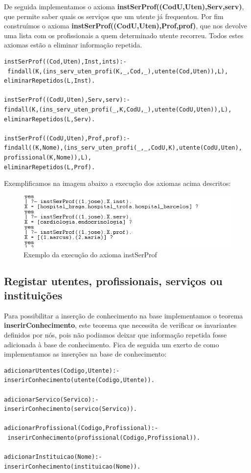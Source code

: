 De seguida implementamos o axioma \textbf{instSerProf((CodU,Uten),Serv,serv)}, que permite saber quais os serviços que um utente já frequentou. 
Por fim construímos o axioma \textbf{instSerProf((CodU,Uten),Prof,prof)}, que nos devolve uma lista com os profissionais a quem determinado utente recorreu. Todos estes axiomas estão a eliminar informação repetida. 

\begin{verbatim}
instSerProf((Cod,Uten),Inst,ints):-
 findall(K,(ins_serv_uten_profi(K,_,Cod,_),utente(Cod,Uten)),L),
eliminarRepetidos(L,Inst).

instSerProf((CodU,Uten),Serv,serv):-
findall(K,(ins_serv_uten_profi(_,K,CodU,_),utente(CodU,Uten)),L),
eliminarRepetidos(L,Serv).

instSerProf((CodU,Uten),Prof,prof):-
findall((K,Nome),(ins_serv_uten_profi(_,_,CodU,K),utente(CodU,Uten),
profissional(K,Nome)),L),
eliminarRepetidos(L,Prof).
\end{verbatim}

Exemplificamos na imagem abaixo a execução dos axiomas acima descritos: 

\begin{figure}[<+htpb+>]
	\centering
	\includegraphics[scale=0.9]{answer8.png}
	\caption{Exemplo da execução do axioma instSerProf}
	\label{p3:fig:output8}
\end{figure}


\subsection{Registar utentes, profissionais, serviços ou instituições}
Para possibilitar a inserção de conhecimento na base implementamos o teorema \textbf{inserirConhecimento}, este teorema que necessita de verificar os invariantes definidos por nós, pois não podiamos deixar que informação repetida fosse adicionada à base de conhecimento. Fica de seguida um exerto de como implementamos as inserções na base de conhecimento: 

\begin{Verbatim}
adicionarUtentes(Codigo,Utente):- 
inserirConhecimento(utente(Codigo,Utente)).

adicionarServico(Servico):- 
inserirConhecimento(servico(Servico)).

adicionarProfissional(Codigo,Profissional):-
 inserirConhecimento(profissional(Codigo,Profissional)).

adicionarInstituicao(Nome):- 
inserirConhecimento(instituicao(Nome)).
\end{Verbatim}

